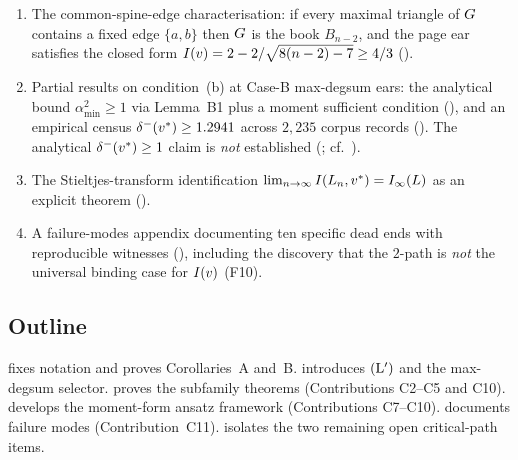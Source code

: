 \begin{enumerate}[label={\textbf{C\arabic*.}},leftmargin=*,itemsep=2pt]
$\approx 0.396$, falling $\approx 0.016$ short of $\threshold$
().
\item The common-spine-edge characterisation: if every maximal
triangle of $G$ contains a fixed edge $\{a, b\}$ then $G$ is
the book $B_{n-2}$, and the page ear satisfies the closed form
$I(v) = 2 - 2/\sqrt{8(n-2) - 7} \ge 4/3$ ().
\item Partial results on condition~(b) at Case-B max-degsum ears:
the analytical bound $\alpha_{\min}^{2} \ge 1$ via Lemma~B1 plus a
moment sufficient condition (), and an
empirical census $\delta^{-}(v^{*}) \ge 1.2941$ across $2{,}235$
corpus records (). The analytical
$\delta^{-}(v^{*}) \ge 1$ claim is \emph{not} established
(; cf.\ ).
\item The Stieltjes-transform identification
$\lim_{n \to \infty} I(L_{n}, v^{*}) = I_{\infty}(L)$ as an explicit
theorem ().
\item A failure-modes appendix documenting ten specific dead ends
with reproducible witnesses (), including the
discovery that the $2$-path is \emph{not} the universal binding case
for $I(v)$ (F10).
\end{enumerate}

\subsection{Outline}\label{sec:intro:outline}

 fixes notation and proves Corollaries~A and~B.
 introduces $(\mathrm{L}')$ and the max-degsum selector.
 proves the subfamily theorems (Contributions
C2--C5 and C10).  develops the moment-form ansatz
framework (Contributions C7--C10).  documents
failure modes (Contribution~C11).  isolates the
two remaining open critical-path items.
